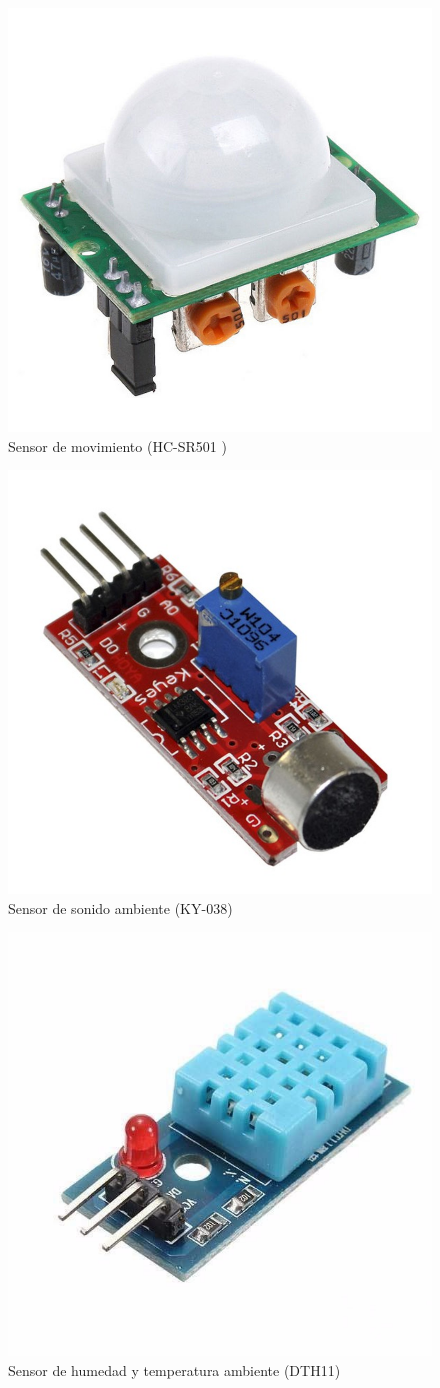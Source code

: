 \documentclass{IEEEtran}
\begin{document}
			\begin{figure}
				\centering
				\includegraphics[width=0.5\linewidth]{arduino-modulo-movimiento}
				\caption{Sensor de movimiento (HC-SR501 )}
				\label{arduino-modulo-movimiento}
			\end{figure}

			\begin{figure}
				\centering
				\includegraphics[width=0.5\linewidth]{arduino-modulo-sonido}
				\caption{Sensor de sonido ambiente (KY-038)}
				\label{arduino-modulo-sonido}
			\end{figure}

			\begin{figure}
				\centering
				\includegraphics[width=0.5\linewidth]{arduino-modulo-temperatura-humedad-ambiente}
				\caption{Sensor de humedad y temperatura ambiente (DTH11)}
				\label{arduino-modulo-temperatura-humedad-ambiente}
			\end{figure}
\end{document}
